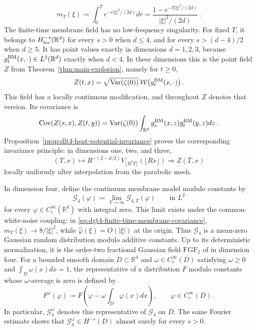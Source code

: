 \documentclass[11pt]{amsart}
\theoremstyle{plain}
\theoremstyle{definition}
\newcommand{\R}{\mathbb{R}}
\DeclareMathOperator{\Var}{Var}
\DeclareMathOperator{\Cov}{Cov}
\begin{document}
	\[
		m_T(\xi)\coloneqq
		\int_0^T e^{-r|\xi|^2/(2d)}dr
		=
		\frac{1-e^{-T|\xi|^2/(2d)}}{|\xi|^2/(2d)}\, .
	\]
	The finite-time membrane field has no low-frequency singularity. For fixed
	$T$, it belongs to $H^{-s}_{\rm loc}(\R^d)$ for every
	$s>0$ when $d\leq4$, and for every $s>(d-4)/2$ when $d\geq5$. It has point
	values exactly in dimensions $d=1,2,3$, because
	$g_t^{\rm BM}(x,\cdot)\in L^2(\R^d)$ exactly when $d<4$. In these
	dimensions this is the point field $Z$ from
	Theorem~\ref{thm:main-explosion}, namely for $t\geq0$,
	\begin{equation}\label{eq:dlt4-linear-gaussian-potential}
		Z(t,x)= \sqrt{\Var(\zeta(0))}\,
		\mathcal W\bigl(g_t^{\rm BM}(x,\cdot)\bigr)\, .
	\end{equation}
	This field has a locally continuous modification, and throughout $Z$ denotes
	that version.
	Its covariance is
	\[
		\Cov(Z(s,x),Z(t,y))
		=
		\Var(\zeta(0))\int_{\R^d}
		g_s^{\rm BM}(x,z)g_t^{\rm BM}(y,z) dz\, .
	\]
	Proposition~\ref{prop:dlt4-heat-potential-invariance} proves the corresponding
	invariance principle: in dimensions one, two, and three,
	\[
		(T,x)\mapsto
		R^{-(2-d/2)}
		V_{\lfloor R^2T\rfloor}(\lfloor Rx\rfloor)
		\Longrightarrow
		Z(T,x)
	\]
	locally uniformly after interpolation from the parabolic mesh.

	In dimension four, define the continuum membrane model modulo constants by
	\[
		\mathcal G_4(\varphi)
		\coloneqq
		\lim_{T\to\infty}\mathcal G_{4,T}(\varphi)
		\qquad\text{in $L^2$}
	\]
	for every $\varphi\in C_c^\infty(\R^4)$ with integral zero. This limit
	exists under the common-white-noise coupling: in
	\eqref{eq:dgt4-finite-time-membrane-covariance},
	$m_T(\xi)\to8/|\xi|^2$, while $\widehat\varphi(\xi)=O(|\xi|)$ at the
	origin. Thus $\mathcal G_4$ is a mean-zero Gaussian random distribution
	modulo additive constants. Up to its deterministic normalization, it is
	the order-two fractional Gaussian field $\mathrm{FGF}_2$ of
	\citet*{LSSW} in dimension four.
	For a bounded smooth domain $D\subset\R^4$ and
	$\omega\in C_c^\infty(D)$ satisfying $\omega\geq0$ and
	$\int_D\omega(x)dx=1$, the representative of a distribution $F$ modulo
	constants whose $\omega$-average is zero is defined by
	\begin{equation}\label{eq:d4-omega-representative}
		F^\omega(\varphi)
		\coloneqq
		F\left(\varphi-\omega\int_D\varphi(x)dx\right),
		\qquad \varphi\in C_c^\infty(D)\, .
	\end{equation}
	In particular, $\mathcal G_4^\omega$ denotes this representative of
	$\mathcal G_4$ on $D$. The same Fourier estimate shows that
	$\mathcal G_4^\omega\in H^{-s}(D)$ almost surely for every $s>0$.
\end{document}
